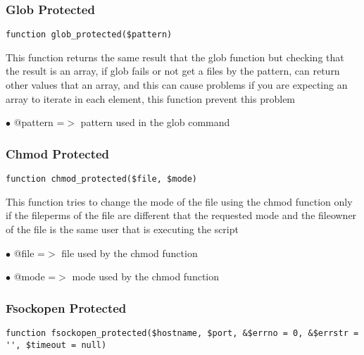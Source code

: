 \documentclass[a4paper]{article}
\begin{document}
\hypertarget{toc139}{}
\subsubsection{Glob Protected}

\begin{lstlisting}
function glob_protected($pattern)
\end{lstlisting}

This function returns the same result that the glob function but checking
that the result is an array, if glob fails or not get a files by the pattern,
can return other values that an array, and this can cause problems if you are
expecting an array to iterate in each element, this function prevent this
problem

\begin{compactitem}
\item[\color{myblue}$\bullet$] @pattern =$>$ pattern used in the glob command
\end{compactitem}

\hypertarget{toc140}{}
\subsubsection{Chmod Protected}

\begin{lstlisting}
function chmod_protected($file, $mode)
\end{lstlisting}

This function tries to change the mode of the file using the chmod function
only if the fileperms of the file are different that the requested mode and
the fileowner of the file is the same user that is executing the script

\begin{compactitem}
\item[\color{myblue}$\bullet$] @file =$>$ file used by the chmod function
\item[\color{myblue}$\bullet$] @mode =$>$ mode used by the chmod function
\end{compactitem}

\hypertarget{toc141}{}
\subsubsection{Fsockopen Protected}

\begin{lstlisting}
function fsockopen_protected($hostname, $port, &$errno = 0, &$errstr = '', $timeout = null)
\end{lstlisting}
\end{document}
